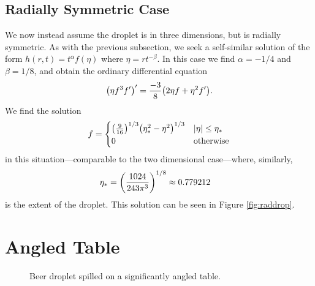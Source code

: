 \documentclass[11pt,a4paper,twocolumn]{article}
\let\originalleft\left
\let\originalright\right
\renewcommand{\left}{\mathopen{}\mathclose\bgroup\originalleft}
\renewcommand{\right}{\aftergroup\egroup\originalright}
\begin{document}
\subsection{Radially Symmetric Case}
We now instead assume the droplet is in three dimensions, but is radially symmetric. As with the previous subsection, we seek a self-similar solution of the form $h(r,t) = t^\alpha f(\eta)$ where $\eta = r t^{-\beta}$. In this case we find $\alpha = -1/4$ and $\beta = 1/8$, and obtain the ordinary differential equation
\begin{align}
\left( \eta f^3 f' \right)' = \frac{-3}{8} \left( 2 \eta f + \eta^2 f' \right). 
\end{align}
We find the solution
\begin{align}
f =
\begin{cases}
 \left( \frac{9}{16} \right)^{1/3} \left( \eta_*^2 - \eta^2 \right)^{1/3} & |\eta| \leq \eta_* \\
0 & \text{otherwise}
\end{cases}
\end{align}
in this situation---comparable to the two dimensional case---where, similarly,
\begin{align}
\eta_* &= \left( \frac{1024}{243 \pi^3} \right)^{1/8} \approx 0.779212
\end{align}
is the extent of the droplet. This solution can be seen in Figure \ref{fig:raddrop}.

\section{Angled Table}
\label{sec:angled}

\begin{figure}[bp]
\centering
{}
\caption{Beer droplet spilled on a significantly angled table.}
\label{fig:tilted}
\end{figure}
\end{document}
